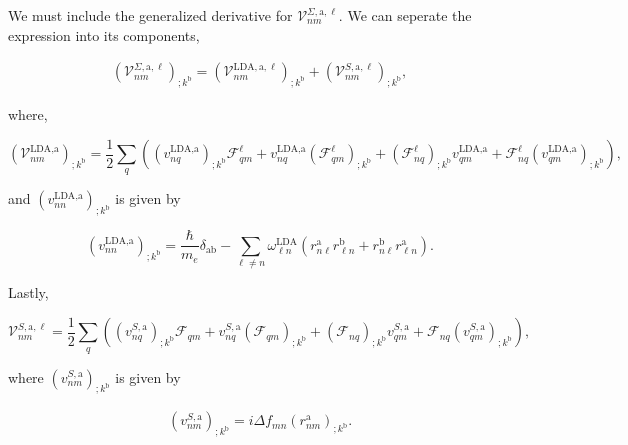 \documentclass[11pt]{article}
\begin{document}
We must include the generalized derivative for $\mathcal{V}^{\Sigma,\text{a},\ell}_{nm}$. We can seperate the expression into its components,

\begin{eqnarray}\label{a.1}
\left(\mathcal{V}^{\Sigma,\text{a},\ell}_{nm}\right)_{;k^\text{b}} = \left(\mathcal{V}^{\text{LDA},\text{a},\ell}_{nm}\right)_{;k^\text{b}} + \left(\mathcal{V}^{S,\text{a},\ell}_{nm}\right)_{;k^\text{b}},
\end{eqnarray}

where, %

\begin{equation}\label{a.2}
\left(\mathcal{V}^{\text{LDA},\text{a}}_{nm}\right)_{;k^\text{b}} = \frac{1}{2}\sum_q\left((v^{\text{LDA},\text{a}}_{nq})_{;k^\text{b}}\mathcal{F}^\ell_{qm} + v^{\text{LDA},\text{a}}_{nq}(\mathcal{F}^\ell_{qm})_{;k^\text{b}} + (\mathcal{F}^\ell_{nq})_{;k^\text{b}} v^{\text{LDA},\text{a}}_{qm} + \mathcal{F}^\ell_{nq} (v^{\text{LDA},\text{a}}_{qm})_{;k^\text{b}}\right),
\end{equation} 

and $\left(v^{\text{LDA},\text{a}}_{nn}\right)_{;k^\text{b}}$ is given by

\begin{equation}
\left(v^{\text{LDA},\text{a}}_{nn}\right)_{;k^\text{b}} = \frac{\hbar}{m_e}\delta_{\text{a}\text{b}} - \sum_{\ell\ne n}\omega^\text{LDA}_{\ell n}\left(r^{\text{a}}_{n\ell}r^\text{b}_{\ell n} + r^\text{b}_{n\ell}r^{\text{a}}_{\ell n}\right).
\end{equation}

Lastly,

\begin{equation}\label{a.3b}
\mathcal{V}^{S,\text{a},\ell}_{nm} = \frac{1}{2}\sum_{q}\left((v^{S,\text{a}}_{nq})_{;k^\text{b}}\mathcal{F}_{qm} + v^{S,\text{a}}_{nq}(\mathcal{F}_{qm})_{;k^\text{b}} + (\mathcal{F}_{nq})_{;k^\text{b}}v_{qm}^{S,\text{a}} + \mathcal{F}_{nq} (v_{qm}^{S,\text{a}})_{;k^\text{b}}\right),
\end{equation}

where $\left(v^{S,\text{a}}_{nm}\right)_{;k^\text{b}}$ is given by

\begin{eqnarray}\label{choni.1}
\left(v^{S,\text{a}}_{nm}\right)_{;k^\text{b}}=i\Delta f_{mn}(r^\text{a}_{nm})_{;k^\text{b}}.
\end{eqnarray}
\end{document}
